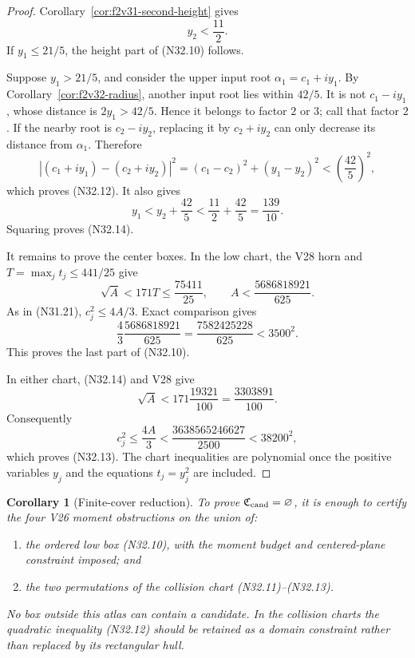 \documentclass[11pt]{article}
\newtheorem{corollary}[theorem]{Corollary}
\theoremstyle{definition}
\theoremstyle{remark}
\begin{document}
\begin{proof}
Corollary~\ref{cor:f2v31-second-height} gives
\[
 y_2<\frac{11}{2}.
 \tag{N32.15}
\]
If \(y_1\leq21/5\), the height part of
\textup{(N32.10)} follows.

Suppose \(y_1>21/5\), and consider the upper input root
\(\alpha_1=c_1+iy_1\).  By
Corollary~\ref{cor:f2v32-radius}, another input root lies within
\(42/5\).  It is not \(c_1-iy_1\), whose distance is
\(2y_1>42/5\).  Hence it belongs to factor \(2\) or \(3\); call that
factor \(2\).  If the nearby root is \(c_2-iy_2\), replacing it by
\(c_2+iy_2\) can only decrease its distance from \(\alpha_1\).
Therefore
\[
 |(c_1+iy_1)-(c_2+iy_2)|^2
 =(c_1-c_2)^2+(y_1-y_2)^2<\left(\frac{42}{5}\right)^2,
 \tag{N32.16}
\]
which proves \textup{(N32.12)}.  It also gives
\[
 y_1<y_2+\frac{42}{5}
 <\frac{11}{2}+\frac{42}{5}
 =\frac{139}{10}.
 \tag{N32.17}
\]
Squaring proves \textup{(N32.14)}.

It remains to prove the center boxes.  In the low chart, the V28 horn
and \(T=\max_jt_j\leq441/25\) give
\[
 \sqrt A<171T\leq\frac{75411}{25},
 \qquad
 A<\frac{5686818921}{625}.
 \tag{N32.18}
\]
As in \textup{(N31.21)}, \(c_j^2\leq4A/3\).  Exact comparison gives
\[
 \frac{4}{3}\frac{5686818921}{625}
 =\frac{7582425228}{625}<3500^2.
 \tag{N32.19}
\]
This proves the last part of \textup{(N32.10)}.

In either chart, \textup{(N32.14)} and V28 give
\[
 \sqrt A<171\frac{19321}{100}
 =\frac{3303891}{100}.
 \tag{N32.20}
\]
Consequently
\[
 c_j^2\leq\frac{4A}{3}
 <\frac{3638565246627}{2500}<38200^2,
 \tag{N32.21}
\]
which proves \textup{(N32.13)}.  The chart inequalities are polynomial
once the positive variables \(y_j\) and the equations \(t_j=y_j^2\)
are included.
\end{proof}

\begin{corollary}[Finite-cover reduction]
\label{cor:f2v32-finite-cover}
To prove \(\mathfrak C_{\rm cand}=\varnothing\), it is enough to certify
the four V26 moment obstructions on the union of:

\begin{enumerate}[label=\textup{(\roman*)}]
\item the ordered low box \textup{(N32.10)}, with the moment budget
and centered-plane constraint imposed; and
\item the two permutations of the collision chart
\textup{(N32.11)}--\textup{(N32.13)}.
\end{enumerate}

No box outside this atlas can contain a candidate.  In the collision
charts the quadratic inequality \textup{(N32.12)} should be retained
as a domain constraint rather than replaced by its rectangular hull.
\end{corollary}
\end{document}
